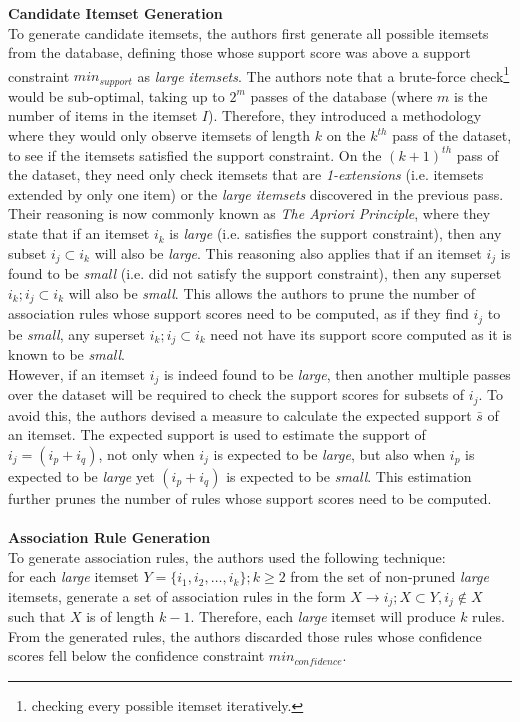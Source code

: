 \textbf{Candidate Itemset Generation}\\
To generate candidate itemsets, the authors first generate all possible itemsets from the database, defining those whose support score was above a support constraint $\textit{min}_\textit{support}$ as \textit{large itemsets}. The authors note that a brute-force check\footnote{checking every possible itemset iteratively.} would be sub-optimal, taking up to $2^m$ passes of the database (where $m$ is the number of items in the itemset $I$). Therefore, they introduced a methodology where they would only observe itemsets of length $k$ on the $k^{th}$ pass of the dataset, to see if the itemsets satisfied the support constraint. On the $(k+1)^{th}$ pass of the dataset, they need only check itemsets that are \textit{1-extensions} (i.e. itemsets extended by only one item) or the \textit{large itemsets} discovered in the previous pass. Their reasoning is now commonly known as \textit{The Apriori Principle}, where they state that if an itemset $i_k$ is \textit{large} (i.e. satisfies the support constraint), then any subset $i_j \subset i_k$ will also be \textit{large}. This reasoning also applies that if an itemset $i_j$ is found to be \textit{small} (i.e. did not satisfy the support constraint), then any superset $i_k; i_j \subset i_k$ will also be \textit{small}. This allows the authors to prune the number of association rules whose support scores need to be computed, as if they find $i_j$ to be \textit{small}, any superset $i_k; i_j \subset i_k$ need not have its support score computed as it is known to be \textit{small}.\\
However, if an itemset $i_j$ is indeed found to be \textit{large}, then another multiple passes over the dataset will be required to check the support scores for subsets of $i_j$. To avoid this, the authors devised a measure to calculate the expected support $\bar{s}$ of an itemset. The expected support is used to estimate the support of $i_j = (i_p + i_q)$, not only when $i_j$ is expected to be \textit{large}, but also when $i_p$ is expected to be \textit{large} yet $(i_p + i_q)$ is expected to be \textit{small}. This estimation further prunes the number of rules whose support scores need to be computed.
\\\\\textbf{Association Rule Generation}\\
To generate association rules, the authors used the following technique:\\
for each \textit{large} itemset $Y = \{i_1, i_2,\dots,i_k\}; k \geq 2$ from the set of non-pruned \textit{large} itemsets, generate a set of association rules in the form $X \rightarrow i_j; X \subset Y, i_j \notin X$ such that $X$ is of length $k-1$. Therefore, each \textit{large} itemset will produce $k$ rules. From the generated rules, the authors discarded those rules whose confidence scores fell below the confidence constraint $\textit{min}_\textit{confidence}$.

